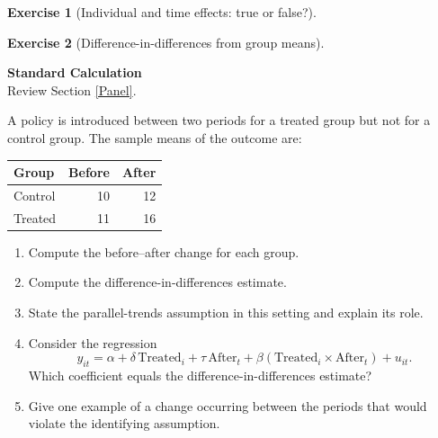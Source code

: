 \documentclass[
  11pt,
]{book}
\providecommand{\tightlist}{%
  \setlength{\itemsep}{0pt}\setlength{\parskip}{0pt}}
\theoremstyle{definition}
\theoremstyle{definition}
\theoremstyle{definition}
\newtheorem{exercise}{Exercise}[chapter]
\theoremstyle{definition}
\theoremstyle{remark}
\begin{document}
\begin{exercisebox}
\begin{exercise}[Individual and time effects: true or false?]
\end{exercise}

\end{exercisebox}


\begin{exercisebox}

\begin{exercise}[Difference-in-differences from group means]
\protect\hypertarget{exr:panel-difference-in-differences}{}\label{exr:panel-difference-in-differences}

\textbf{Standard \textbar{} Calculation}\\
Review Section \ref{Panel}.

A policy is introduced between two periods for a treated group but not for a control group. The sample means of the outcome are:

\begin{longtable}[]{@{}lrr@{}}
\toprule\noalign{}
Group & Before & After \\
\midrule\noalign{}
\endhead
\bottomrule\noalign{}
\endlastfoot
Control & 10 & 12 \\
Treated & 11 & 16 \\
\end{longtable}

\begin{enumerate}
\def\labelenumi{\arabic{enumi}.}
\tightlist
\item
  Compute the before--after change for each group.
\item
  Compute the difference-in-differences estimate.
\item
  State the parallel-trends assumption in this setting and explain its role.
\item
  Consider the regression
  \[
  y_{it}=\alpha+\delta\,\mathrm{Treated}_i+\tau\,\mathrm{After}_t
  +\beta(\mathrm{Treated}_i\times\mathrm{After}_t)+u_{it}.
  \]
  Which coefficient equals the difference-in-differences estimate?
\item
  Give one example of a change occurring between the periods that would violate the identifying assumption.
\end{enumerate}

\end{exercise}

\end{exercisebox}

\end{document}
